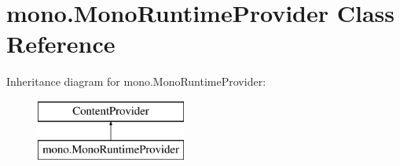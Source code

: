 \hypertarget{classmono_1_1MonoRuntimeProvider}{}\section{mono.\+Mono\+Runtime\+Provider Class Reference}
\label{classmono_1_1MonoRuntimeProvider}
Inheritance diagram for mono.\+Mono\+Runtime\+Provider\+:\begin{figure}[H]
\begin{center}
\leavevmode
\includegraphics[height=2.000000cm]{classmono_1_1MonoRuntimeProvider}
\end{center}
\end{figure}
